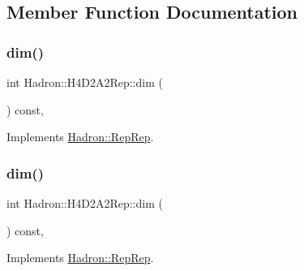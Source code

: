 \subsection{Member Function Documentation}
\mbox{\label{structHadron_1_1H4D2A2Rep_a5ed94d218de0113ea027710e08c23684}} 
\subsubsection{\texorpdfstring{dim()}{dim()}\hspace{0.1cm}{\footnotesize\ttfamily [1/5]}}
{\footnotesize\ttfamily int Hadron\+::\+H4\+D2\+A2\+Rep\+::dim (\begin{DoxyParamCaption}{ }\end{DoxyParamCaption}) const\hspace{0.3cm}{\ttfamily [inline]}, {\ttfamily [virtual]}}



Implements \mbox{\hyperlink{structHadron_1_1RepRep_a92c8802e5ed7afd7da43ccfd5b7cd92b}{Hadron\+::\+Rep\+Rep}}.

\mbox{\label{structHadron_1_1H4D2A2Rep_a5ed94d218de0113ea027710e08c23684}} 
\subsubsection{\texorpdfstring{dim()}{dim()}\hspace{0.1cm}{\footnotesize\ttfamily [2/5]}}
{\footnotesize\ttfamily int Hadron\+::\+H4\+D2\+A2\+Rep\+::dim (\begin{DoxyParamCaption}{ }\end{DoxyParamCaption}) const\hspace{0.3cm}{\ttfamily [inline]}, {\ttfamily [virtual]}}



Implements \mbox{\hyperlink{structHadron_1_1RepRep_a92c8802e5ed7afd7da43ccfd5b7cd92b}{Hadron\+::\+Rep\+Rep}}.

\mbox{\label{structHadron_1_1H4D2A2Rep_a5ed94d218de0113ea027710e08c23684}} 
